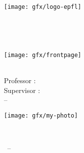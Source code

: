 \begin{titlepage}
	\begin{addmargin}[-1cm]{-3cm}
    \begin{center}
        \large  

        \hfill

        \begin{minipage}{\textwidth}
          \begin{flushleft}
            \texttt{[image: gfx/logo-epfl]}  \\
          \end{flushleft}
        \end{minipage}

        \vfill



        \begingroup
            \color{Maroon}\spacedallcaps{\myTitle} \\ \bigskip
        \endgroup

        \mySubtitle \\ \medskip   


        \vfill

        \texttt{[image: gfx/frontpage]} \\ \bigskip


        \begin{minipage}{0.59\textwidth}
          \begin{flushleft}
            \medskip
            \textsc{\myName} \\
            Professor : \textsc{\myProf} \\
            Supervisor : \textsc{\mySupervisor} \\
            \myFaculty -- \myDepartment                             
          \end{flushleft}
        \end{minipage}
        \begin{minipage}{0.39\textwidth}
          \begin{flushright}
            \texttt{[image: gfx/my-photo]}  \\
          \end{flushright}
        \end{minipage}\\[1.5cm]

        \bigskip
        

        \myTime\ -- \myVersion \\ \bigskip

        \vfill                      

    \end{center}  
  \end{addmargin}       
\end{titlepage}   
